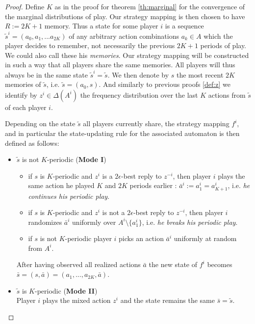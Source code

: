 \documentclass[a4paper]{article}
\theoremstyle{plain}
\theoremstyle{remark}
\begin{document}
\begin{proof}
	Define $K$ as in the proof for theorem \ref{th:marginal} for the convergence of the marginal
	distributions of play. Our strategy mapping is then chosen to have $R := 2K + 1$ memory.
	Thus a state for some player $i$ is a sequence $\tilde{s}^i = (a_0, a_1, ... a_{2K})$ of any arbitrary action combinations $a_k \in A$
	which the player decides to remember, not necessarily the previous $2K+1$ periods of play. We could also call these his \emph{memories}.
    Our strategy mapping will be constructed in such a way that all players share the same memories. All players will thus
    always be in the same state $\tilde{s}^i = \tilde{s}$.
	We then denote by $s$ the most recent $2K$ memories of $\tilde{s}$, i.e. $\tilde{s} = (a_0, s)$.
	And similarly to previous proofs \ref{def:z} we identify by $z^i \in \Delta(A^i)$ the frequency distribution over the
	last $K$ actions from $\tilde{s}$ of each player $i$.
	
	\medskip
	Depending on the state $\tilde{s}$ all players currently share, the strategy mapping $f^i$, and 
	in particular the state-updating rule for the associated automaton is then defined as follows:
	
	\begin{itemize}
		\item $\tilde{s}$ is not $K$-periodic ({\bf Mode I})
		\begin{itemize}
			\item	if $s$ is $K$-periodic and $z^i$ is a $2\epsilon$-best reply to $z^{-i}$, 
			then player $i$ plays the same action he played $K$ and $2K$ periods earlier : $\bar{a}^i := a^i_1 = a^i_{K+1}$,
			i.e. \emph{he continues his periodic play}.
			
			\item if $s$ is $K$-periodic and $z^i$ is not a $2\epsilon$-best reply to $z^{-i}$,
			then player $i$ randomizes $\bar{a}^i$ uniformly over $A^i \setminus \{a^i_1\}$,
			i.e. \emph{he breaks his periodic play}.
			
			\item if $s$ is not $K$-periodic player $i$ picks an action $\bar{a}^i$ uniformly at random from $A^i$.
		\end{itemize}
		After having observed all realized actions $\bar{a}$ the new state of $f^i$ becomes
		$\bar{s} = (s, \bar{a}) = (a_1, ..., a_{2K}, \bar{a})$.
			
		\item $\tilde{s}$ is $K$-periodic ({\bf Mode II})\\
			Player $i$ plays the mixed action $z^i$ and the state remains the same $\bar{s} = \tilde{s}$.
		

\end{itemize}
\end{proof}
\end{document}
